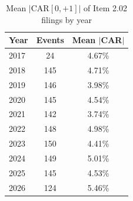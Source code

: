 \begin{table}[H]
\centering
\caption{Mean $|$CAR$[0,+1]|$ of Item 2.02 filings by year}
\begin{tabular}{lcc}
\toprule
Year & Events & Mean $|$CAR$|$ \\
\midrule
2017 & 24 & 4.67\% \\
2018 & 145 & 4.71\% \\
2019 & 146 & 3.98\% \\
2020 & 145 & 4.54\% \\
2021 & 142 & 3.74\% \\
2022 & 148 & 4.98\% \\
2023 & 150 & 4.41\% \\
2024 & 149 & 5.01\% \\
2025 & 145 & 4.53\% \\
2026 & 124 & 5.46\% \\
\bottomrule
\end{tabular}
\end{table}
